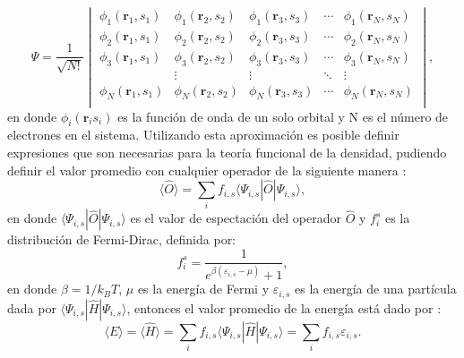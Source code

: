 	\begin{equation}
	\Psi = \frac{1}{\sqrt{N !}}
	\begin{vmatrix}
	\phi_1 (\pmb{r}_1, s_1) & \phi_1 (\pmb{r}_2, s_2) & \phi_1 (\pmb{r}_3, s_3) & \cdots & \phi_1 (\pmb{r}_N, s_N) \\
	\phi_2 (\pmb{r}_1, s_1) & \phi_2 (\pmb{r}_2, s_2) & \phi_2 (\pmb{r}_3, s_3) & \cdots & \phi_2 (\pmb{r}_N, s_N)\\
	\phi_3 (\pmb{r}_1, s_1) & \phi_3 (\pmb{r}_2, s_2) & \phi_3 (\pmb{r}_3, s_3) & \cdots & \phi_3 (\pmb{r}_N, s_N) \\
	                       &  \vdots                     & \vdots                      &  \ddots & \vdots\\
	\phi_N (\pmb{r}_1, s_1) & \phi_N (\pmb{r}_2, s_2) & \phi_N (\pmb{r}_3, s_3) & \cdots & \phi_N (\pmb{r}_N, s_N) \\
	  
	\end{vmatrix} \label{ec:slater},
	\end{equation}
	en donde $\phi_i (\pmb{r}_i s_i)$ es la funci\'on de onda de un solo orbital y N es el n\'umero de electrones en el sistema.
	\newline
	Utilizando esta aproximaci\'on es posible definir expresiones que son necesarias para la teor\'ia funcional de la densidad, pudiendo definir el valor promedio con cualquier operador de la siguiente manera \cite{Martin-2004}:
	\begin{equation}
	\langle \hat{O} \rangle= \sum_{i} f_{i,s} \langle \Psi_{i,s} | \hat{O} | \Psi_{i,s}\rangle , \label{ec:prom}
	\end{equation} 
	\newline
	en donde $\langle \Psi_{i,s} | \hat{O} | \Psi_{i,s} \rangle$ es el valor de espectaci\'on del operador $\hat{O}$ y $f_{i}^{s}$ es la distribuci\'on de Fermi-Dirac, definida por:
	\begin{equation}
	f_{i}^{s}= \frac{1}{e^{\beta (\varepsilon_{i,s}-\mu)}+1}, \label{ec:fermi-dirac}
	\end{equation}
	en donde $\beta= 1/k_B T$, $\mu$ es la energ\'ia de Fermi y $\varepsilon_{i,s}$ es la energ\'ia de una part\'icula dada por $\langle \Psi_{i,s} | \hat{H} | \Psi_{i,s}\rangle$, entonces el valor promedio de la energ\'ia est\'a dado por \cite{Faustino-2014}:
	\begin{equation}
	\langle E \rangle = \langle \hat{H} \rangle = \sum_{i} f_{i,s} \langle \Psi_{i,s} | \hat{H} | \Psi_{i,s}\rangle = \sum_{i} f_{i,s}  \varepsilon_{i,s} \label{ec:energia1} .
	\end{equation}
